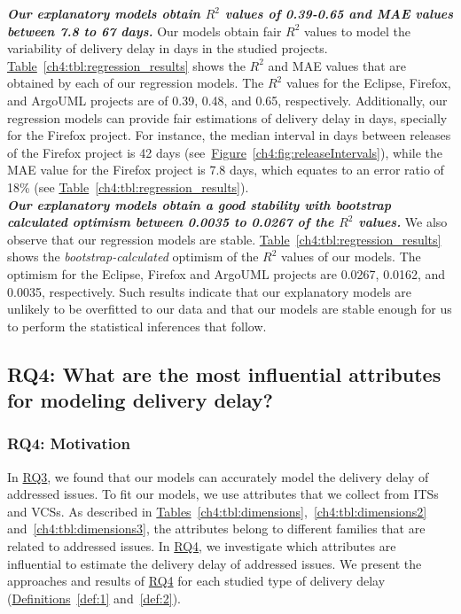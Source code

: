 \noindent\textbf{\textit{Our explanatory models obtain $R^2$ values of 0.39-0.65
and MAE values between 7.8 to 67 days.}} Our models obtain fair $R^2$ values to
model the variability of delivery delay in days in the studied projects.
\hyperref[ch4:tbl:regression_results]{Table}~\ref{ch4:tbl:regression_results} shows the
$R^2$ and MAE values that are obtained by each of our regression models. The
$R^2$ values for the Eclipse, Firefox, and ArgoUML projects are of 0.39, 0.48,
and 0.65, respectively. 
Additionally, our regression models can provide fair
estimations of delivery delay in days, specially for the Firefox project. For
instance, the median interval in days between releases of the Firefox project is
42 days
(see~\hyperref[ch4:fig:releaseIntervals]{Figure}~\ref{ch4:fig:releaseIntervals}), while
the MAE value for the Firefox project is 7.8 days, which equates to an error
ratio of 18\% (see
\hyperref[ch4:tbl:regression_results]{Table}~\ref{ch4:tbl:regression_results}).\\

\noindent\textbf{\textit{Our explanatory models obtain a good stability with bootstrap
calculated optimism between 0.0035 to 0.0267 of the $R^2$ values.}} We also
observe that our regression models are stable.
\hyperref[ch4:tbl:regression_results]{Table}~\ref{ch4:tbl:regression_results} shows the
\textit{bootstrap-calculated} optimism of the $R^2$ values of our models. The
optimism for the Eclipse, Firefox and ArgoUML projects are 0.0267, 0.0162, and 0.0035,
respectively. Such results indicate that our explanatory models are unlikely to
be overfitted to our data and that our models are stable enough for us to perform the
statistical inferences that follow. 


\subsection{RQ4: What are the most influential attributes for
modeling delivery delay?}\label{ch4:rq4}

\subsubsection*{RQ4: Motivation} In \hyperref[ch4:rq3]{RQ3}, we found that our
models can accurately model the delivery delay of addressed issues. To fit our
models, we use attributes that we collect from ITSs and VCSs. As described in
\hyperref[ch4:tbl:dimensions]{Tables}~\ref{ch4:tbl:dimensions},~\ref{ch4:tbl:dimensions2}
and~\ref{ch4:tbl:dimensions3}, the attributes belong to different families that
are related to addressed issues. In \hyperref[ch4:rq4]{RQ4}, we investigate
which attributes are influential to estimate the delivery delay of addressed
issues. We present the approaches and results of \hyperref[ch4:rq4]{RQ4} for
each studied type of delivery delay (\hyperref[def:1]{Definitions}~\ref{def:1}
and~\ref{def:2}). 

